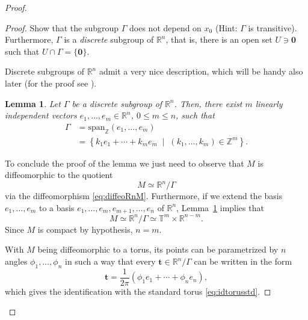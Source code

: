 \documentclass[english,fontsize=11pt,paper=a5,oneside]{scrbook}
\newcommand{\Z}{\mathbb{Z}}
\newcommand{\R}{\mathbb{R}}
\newcommand{\T}{\mathbb{T}}
\newtheorem{lemma}[theorem]{Lemma}
\theoremstyle{definition}
\newenvironment{exercise}
  {\pushQED{\qed}\renewcommand{\qedsymbol}{$\maltese$}\exercisex}
  {\popQED\endexercisex}
\begin{document}
\begin{proof}
\begin{proof}
        \begin{exercise}
            Show that the subgroup $\Gamma$ does not depend on $x_0$ (Hint: $\Gamma$ is transitive). 
            Furthermore, $\Gamma$ is a \emph{discrete} subgroup of $\R^n$, that is, there is an open set $U \ni \bm 0$ such that $U\cap\Gamma = \{\bm 0\}$.
        \end{exercise}

        Discrete subgroups of $\R^n$ admit a very nice description, which will be handy also later (for the proof see \cite[Lemma 13.4]{book:knauf}).

        \begin{lemma}
            \label{lem:reprTm}
            Let $\Gamma$ be a discrete subgroup of $\R^n$. Then, there exist $m$ linearly independent vectors $e_1, \ldots, e_m \in \R^n$, $0\leq m \leq n$, such that
            \begin{align}
                \Gamma &= \mathrm{span}_{\Z}(e_1, \ldots, e_m)\\
                & = \left\{
                    k_1 e_1 + \cdots + k_m e_m \;\mid\; (k_1, \ldots, k_m)\in\Z^m
                    \right\}.
            \end{align}
        \end{lemma}

        To conclude the proof of the lemma we just need to observe that $M$ is diffeomorphic to the quotient
        \begin{equation}
            M \simeq \R^n / \Gamma
        \end{equation}
        via the diffeomorphism \eqref{eq:diffeoRnM}. Furthermore, if we extend the basis $e_1, \ldots, e_m$ to a basis $e_1, \ldots, e_m, e_{m+1}, \ldots,e_n$ of $\R^n$, Lemma~\ref{lem:reprTm} implies that
        \begin{equation}
            M \simeq \R^n / \Gamma \simeq \T^m \times \R^{n-m}.
        \end{equation}
        Since $M$ is compact by hypothesis, $n=m$.

        With $M$ being diffeomorphic to a torus, its points can be parametrized by $n$ angles $\phi_1, \ldots, \phi_n$ in such a way that every $\bm t \in \R^n/\Gamma$ can be written in the form
        \begin{equation}
            \bm t = \frac 1{2\pi}(\phi_1 e_1 + \cdots + \phi_n e_n),
        \end{equation}
        which gives the identification with the standard torus \eqref{eq:idtorusstd}.
    \end{proof}


\end{proof}
\end{document}
